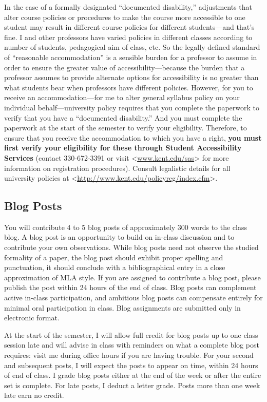 \documentclass[]{article}
\begin{document}
In the case of a formally designated ``documented disability,''
adjustments that alter course policies or procedures to make the course
more accessible to one student may result in different course policies
for different students---and that's fine. I and other professors have
varied policies in different classes according to number of students,
pedagogical aim of class, etc. So the legally defined standard of
``reasonable accommodation'' is a sensible burden for a professor to
assume in order to ensure the greater value of accessibility---because
the burden that a professor assumes to provide alternate options for
accessibility is no greater than what students bear when professors have
different policies. However, for you to receive an accommodation---for
me to alter general syllabus policy on your individual
behalf---university policy requires that you complete the paperwork to
verify that you have a ``documented disability.'' And you must complete
the paperwork at the start of the semester to verify your eligibility.
Therefore, to ensure that you receive the accommodation to which you
have a right, \textbf{you must first verify your eligibility for these
through Student Accessibility Services} (contact 330-672-3391 or visit
\textless{}\url{www.kent.edu/sas}\textgreater{} for more information on
registration procedures). Consult legalistic details for all university
policies at
\textless{}\url{http://www.kent.edu/policyreg/index.cfm}\textgreater{}.

\subsection{Blog Posts}\label{blog-posts}

You will contribute 4 to 5 blog posts of approximately 300 words to the
class blog. A blog post is an opportunity to build on in-class
discussion and to contribute your own observations. While blog posts
need not observe the studied formality of a paper, the blog post should
exhibit proper spelling and punctuation, it should conclude with a
bibliographical entry in a close approximation of MLA style. If you are
assigned to contribute a blog post, please publish the post within 24
hours of the end of class. Blog posts can complement active in-class
participation, and ambitious blog posts can compensate entirely for
minimal oral participation in class. Blog assignments are submitted only
in electronic format.

At the start of the semester, I will allow full credit for blog posts up
to one class session late and will advise in class with reminders on
what a complete blog post requires: visit me during office hours if you
are having trouble. For your second and subsequent posts, I will expect
the posts to appear on time, within 24 hours of end of class. I grade
blog posts either at the end of the week or after the entire set is
complete. For late posts, I deduct a letter grade. Posts more than one
week late earn no credit.
\end{document}
